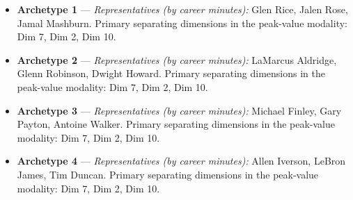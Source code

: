 \begin{itemize}
\item \textbf{Archetype 1} --- \emph{Representatives (by career minutes):} Glen Rice, Jalen Rose, Jamal Mashburn. Primary separating dimensions in the peak-value modality: Dim 7, Dim 2, Dim 10.
\item \textbf{Archetype 2} --- \emph{Representatives (by career minutes):} LaMarcus Aldridge, Glenn Robinson, Dwight Howard. Primary separating dimensions in the peak-value modality: Dim 7, Dim 2, Dim 10.
\item \textbf{Archetype 3} --- \emph{Representatives (by career minutes):} Michael Finley, Gary Payton, Antoine Walker. Primary separating dimensions in the peak-value modality: Dim 7, Dim 2, Dim 10.
\item \textbf{Archetype 4} --- \emph{Representatives (by career minutes):} Allen Iverson, LeBron James, Tim Duncan. Primary separating dimensions in the peak-value modality: Dim 7, Dim 2, Dim 10.
\end{itemize}
